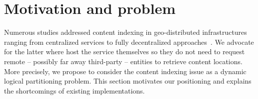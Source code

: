 \section{Motivation and problem}
\label{sec:background}



Numerous studies addressed content indexing in geo-distributed
infrastructures ranging from centralized services to fully
decentralized approaches~\cite{squirrel}. We advocate for the latter
where \processes host the service themselves so they do not need to
request remote -- possibly far away third-party -- entities to
retrieve content locations.  More precisely, we propose to consider the content
indexing issue as a dynamic logical partitioning problem. This section
motivates our positioning and explains the shortcomings of existing
implementations.


